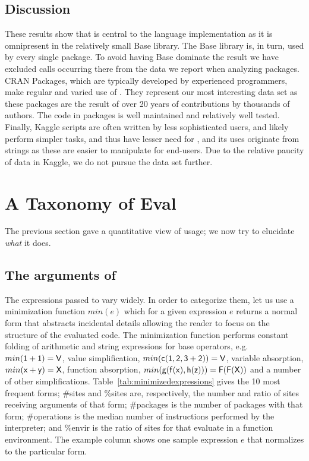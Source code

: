 \documentclass[screen,acmsmall]{acmart}
\begin{document}
\medskip

\subsection{Discussion}
These results show that \eval is central to the language implementation as it is
omnipresent in the relatively small Base library. The Base library is, in turn,
used by every single package. To avoid having Base dominate the result we have
excluded calls occurring there from the data we report when analyzing packages.
CRAN Packages, which are typically developed by experienced programmers, make
regular and varied use of \eval. They represent our most interesting data set as
these packages are the result of over 20 years of contributions by thousands of
authors. The code in packages is well maintained and relatively well tested.
Finally, Kaggle scripts are often written by less sophisticated users, and
likely perform simpler tasks, and thus have lesser need for \eval, and its uses
originate from strings as these are easier to manipulate for end-users. Due to
the relative paucity of data in Kaggle, we do not pursue the data set further.

\newpage
\section{A Taxonomy of Eval}

The previous section gave a quantitative view of \eval usage; we now try to
elucidate \emph{what} it does.

\subsection{The arguments of \eval}

The expressions passed to \eval vary widely. In order to categorize them, let us
use a minimization function $min(e)$ which for a given expression $e$ returns a
normal form that abstracts incidental details allowing the reader to focus on
the structure of the evaluated code. The minimization function performs constant
folding of arithmetic and string expressions for base operators, e.g.
$min({\sf 1+1})={\sf V}$, value simplification, $min({\sf c(1,2,3+2)})={\sf V}$,
variable absorption, $min({\sf x+y})={\sf X}$, function absorption,
$min({\sf g(f(x),h(z))})={\sf F(F(X))}$ and a number of other simplifications.
Table~\ref{tab:minimizedexpressions} gives the 10 most frequent forms; \#sites
and \%sites are, respectively, the number and ratio of sites receiving arguments
of that form; \#packages is the number of packages with that form; \#operations
is the median number of instructions performed by the interpreter; and \%envir
is the ratio of sites for that evaluate in a function environment. The example
column shows one sample expression $e$ that normalizes to the particular form.
\end{document}
